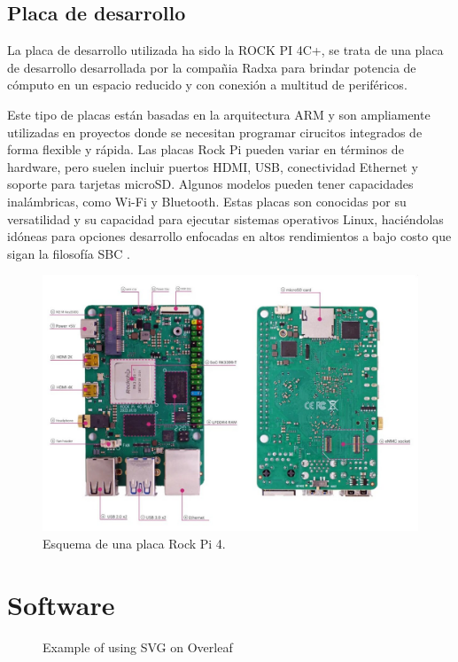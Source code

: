 \subsection{Placa de desarrollo}
La placa de desarrollo utilizada ha sido la ROCK PI 4C+, se trata de una placa de desarrollo desarrollada por la compañia Radxa para brindar potencia de cómputo en un espacio reducido y con conexión a multitud de periféricos. 

Este tipo de placas están basadas en la arquitectura ARM y son ampliamente utilizadas en proyectos donde se necesitan programar cirucitos integrados de forma flexible y rápida. Las placas Rock Pi pueden variar en términos de hardware, pero suelen incluir puertos HDMI, USB, conectividad Ethernet y soporte para tarjetas microSD. Algunos modelos pueden tener capacidades inalámbricas, como Wi-Fi y Bluetooth. 
Estas placas son conocidas por su versatilidad y su capacidad para ejecutar sistemas operativos Linux, haciéndolas idóneas para opciones desarrollo enfocadas en altos rendimientos a bajo costo que sigan la filosofía \acrshort{SBC} \cite{web_rockpi}.

\begin{figure}[h!]
    \centering
    \includegraphics[scale=0.15]{figuras/rock-pi-model-c-plus_06.jpg}
    \caption{Esquema de una placa Rock Pi 4.}
    \label{fig:rockpi_esquema}
\end{figure}

\section{Software}

\begin{figure}[t!]
\centerline{}
\caption{Example of using SVG on Overleaf}
\label{fig: example}
\end{figure}